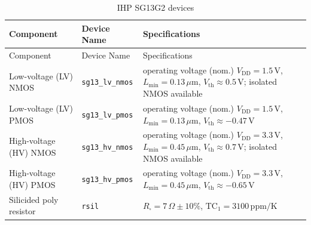 \documentclass[
  a4paper,
  DIV=11,
  numbers=noendperiod]{scrartcl}
\begin{document}
\begin{longtable}[]{@{}
  >{\raggedright\arraybackslash}p{}
  >{\raggedright\arraybackslash}p{}
  >{\raggedright\arraybackslash}p{}@{}}
\caption{IHP SG13G2 devices}\label{tbl-sg13g2-devices}\tabularnewline
\toprule\noalign{}
\begin{minipage}[b]{\linewidth}\raggedright
Component
\end{minipage} & \begin{minipage}[b]{\linewidth}\raggedright
Device Name
\end{minipage} & \begin{minipage}[b]{\linewidth}\raggedright
Specifications
\end{minipage} \\
\midrule\noalign{}
\endfirsthead
\toprule\noalign{}
\begin{minipage}[b]{\linewidth}\raggedright
Component
\end{minipage} & \begin{minipage}[b]{\linewidth}\raggedright
Device Name
\end{minipage} & \begin{minipage}[b]{\linewidth}\raggedright
Specifications
\end{minipage} \\
\midrule\noalign{}
\endhead
\bottomrule\noalign{}
\endlastfoot
Low-voltage (LV) NMOS & \texttt{sg13\_lv\_nmos} & operating voltage
(nom.) \(V_\mathrm{DD}=1.5\,\text{V}\),
\(L_\mathrm{min}=0.13\,\mu\text{m}\),
\(V_\mathrm{th}\approx 0.5\,\text{V}\); isolated NMOS available \\
Low-voltage (LV) PMOS & \texttt{sg13\_lv\_pmos} & operating voltage
(nom.) \(V_\mathrm{DD}=1.5\,\text{V}\),
\(L_\mathrm{min}=0.13\,\mu\text{m}\),
\(V_\mathrm{th}\approx -0.47\,\text{V}\) \\
High-voltage (HV) NMOS & \texttt{sg13\_hv\_nmos} & operating voltage
(nom.) \(V_\mathrm{DD}=3.3\,\text{V}\),
\(L_\mathrm{min}=0.45\,\mu\text{m}\),
\(V_\mathrm{th}\approx 0.7\,\text{V}\); isolated NMOS available \\
High-voltage (HV) PMOS & \texttt{sg13\_hv\_pmos} & operating voltage
(nom.) \(V_\mathrm{DD}=3.3\,\text{V}\),
\(L_\mathrm{min}=0.45\,\mu\text{m}\),
\(V_\mathrm{th}\approx -0.65\,\text{V}\) \\
Silicided poly resistor & \texttt{rsil} &
\(R_\square=7\,\Omega \pm 10\%\), \(\text{TC}_1=3100\,\text{ppm/K}\) \\

\end{longtable}
\end{document}
